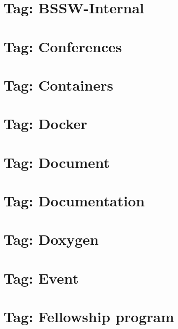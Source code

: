 \documentclass[twoside]{book}
\newcommand{\+}{\discretionary{\mbox{\scriptsize$\hookleftarrow$}}{}{}}
\begin{document}
\chapter{Tag\+: B\+S\+S\+W-\/\+Internal}
\label{md_markdown_tag_bssw-internal}

\chapter{Tag\+: Conferences}
\label{md_markdown_tag_conferences}

\chapter{Tag\+: Containers}
\label{md_markdown_tag_containers}

\chapter{Tag\+: Docker}
\label{md_markdown_tag_docker}

\chapter{Tag\+: Document}
\label{md_markdown_tag_document}

\chapter{Tag\+: Documentation}
\label{md_markdown_tag_documentation}

\chapter{Tag\+: Doxygen}
\label{md_markdown_tag_doxygen}

\chapter{Tag\+: Event}
\label{md_markdown_tag_event}

\chapter{Tag\+: Fellowship program}
\label{md_markdown_tag_fellowship_program}

\end{document}
